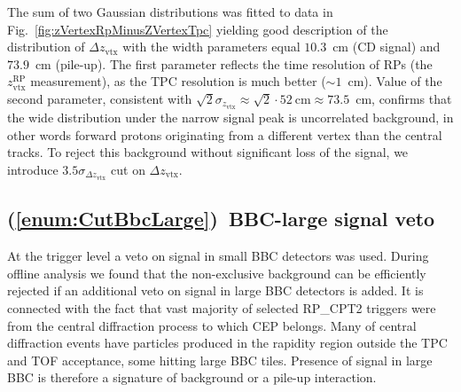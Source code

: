 The sum of two Gaussian distributions was fitted to data in Fig.~\ref{fig:zVertexRpMinusZVertexTpc} yielding good description of the distribution of $\Delta z_{\text{vtx}}$ with the width parameters equal $10.3$~cm (CD signal) and $73.9$~cm (pile-up). The first parameter reflects the time resolution of RPs (the $z_{\text{vtx}}^{\text{RP}}$ measurement), as the TPC resolution is much better ($\sim 1$~cm). Value of the second parameter, consistent with $\sqrt{2}\sigma_{z_{\text{vtx}}}\approx\sqrt{2}\cdot52~\text{cm}\approx 73.5$~cm, confirms that the wide distribution under the narrow signal peak is uncorrelated background, in other words forward protons originating from a different vertex than the central tracks. To reject this background without significant loss of the signal, we introduce $3.5\sigma_{\Delta z_{\text{vtx}}}$ cut on $\Delta z_{\text{vtx}}$.






\subsection{(\ref{enum:CutBbcLarge})~BBC-large signal veto}

At the trigger level a veto on signal in small BBC detectors was used. During offline analysis we found that the non-exclusive background can be efficiently rejected if an additional veto on signal in large BBC detectors is added. It is connected with the fact that vast majority of selected RP\_CPT2 triggers were from the central diffraction process to which CEP belongs. Many of central diffraction events have particles produced in the rapidity region outside the TPC and TOF acceptance, some hitting large BBC tiles. Presence of signal in large BBC is therefore a signature of background or a pile-up interaction.


